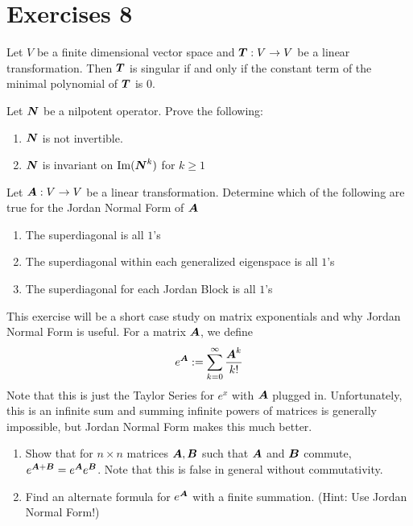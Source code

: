\section{Exercises 8}

\begin{exercise}
    Let $V$ be a finite dimensional vector space and $\boldsymbol{T}:V\to V$ be a linear transformation. Then $\boldsymbol{T}$ is singular if and only if the constant term of the minimal polynomial of $\boldsymbol{T}$ is $0$.
\end{exercise}

\begin{exercise}
    Let $\boldsymbol{N}$ be a nilpotent operator. Prove the following:
    \begin{enumerate}[label=(\alph*)]
        \item $\boldsymbol{N}$ is not invertible.
        \item $\boldsymbol{N}$ is invariant on $\operatorname{Im}(\boldsymbol{N}^{k})$ for $k\geq 1$
    \end{enumerate}
\end{exercise}

\begin{exercise}
    Let $\boldsymbol{A}:V\to V$ be a linear transformation. Determine which of the following are true for the Jordan Normal Form of $\boldsymbol{A}$
    \begin{enumerate}[label=(\alph*)]
        \item The superdiagonal is all $1$'s
        \item The superdiagonal within each generalized eigenspace is all $1$'s
        \item The superdiagonal for each Jordan Block is all $1$'s
    \end{enumerate}
\end{exercise}

\begin{exercise}
    This exercise will be a short case study on matrix exponentials and why Jordan Normal Form is useful. For a matrix $\boldsymbol{A}$, we define
    \[
    e^{\boldsymbol{A}}:=\sum_{k=0}^\infty\frac{\boldsymbol{A}^k}{k!}
    \]
    Note that this is just the Taylor Series for $e^x$ with $\boldsymbol{A}$ plugged in. Unfortunately, this is an infinite sum and summing infinite powers of matrices is generally impossible, but Jordan Normal Form makes this much better.
    \begin{enumerate}[label=(\alph*)]
        \item Show that for $n\times n$ matrices $\boldsymbol{A},\boldsymbol{B}$ such that $\boldsymbol{A}$ and $\boldsymbol{B}$ commute, $e^{\boldsymbol{A}+\boldsymbol{B}}=e^{\boldsymbol{A}}e^{\boldsymbol{B}}$. Note that this is false in general without commutativity.
        \item Find an alternate formula for $e^{\boldsymbol{A}}$ with a finite summation. (Hint: Use Jordan Normal Form!)
    \end{enumerate}
\end{exercise}